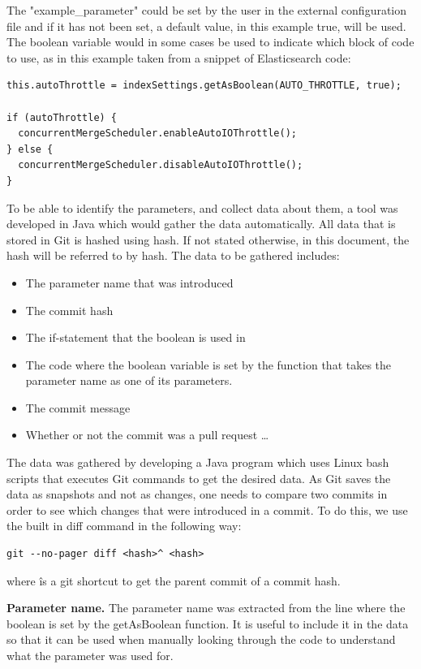 The "example\_parameter" could be set by the user in the external configuration file and if it has not been set, a default value, in this example true, will be used. The boolean variable would in some cases be used to indicate which block of code to use, as in this example taken from a snippet of Elasticsearch code:\\
\lstset{language=Java}
\begin{lstlisting}[frame=single]
this.autoThrottle = indexSettings.getAsBoolean(AUTO_THROTTLE, true);

if (autoThrottle) {
  concurrentMergeScheduler.enableAutoIOThrottle();
} else {
  concurrentMergeScheduler.disableAutoIOThrottle();
}
\end{lstlisting}

To be able to identify the parameters, and collect data about them, a tool was developed in Java which would gather the data automatically. All data that is stored in Git is hashed using hash. If not stated otherwise, in this document, the hash will be referred to by hash. The data to be gathered includes:
\begin{itemize}
\item The parameter name that was introduced
\item The commit hash
\item The if-statement that the boolean is used in
\item The code where the boolean variable is set by the function that takes the parameter name as one of its parameters.
\item The commit message
\item Whether or not the commit was a pull request \ldots
\end{itemize}
The data was gathered by developing a Java program which uses Linux bash scripts that executes Git commands to get the desired data. As Git saves the data as snapshots and not as changes, one needs to compare two commits in order to see which changes that were introduced in a commit. To do this, we use the built in diff command in the following way: %
\lstset{language=Bash}
\begin{lstlisting}[frame=single]
git --no-pager diff <hash>^ <hash>
\end{lstlisting}
where \^ is a git shortcut to get the parent commit of a commit hash.

\textbf{Parameter name.} The parameter name was extracted from the line where the boolean is set by the getAsBoolean function. It is useful to include it in the data so that it can be used when manually looking through the code to understand what the parameter was used for.

